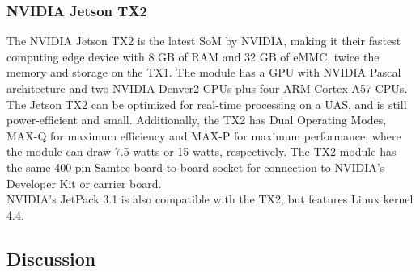 \documentclass[letterpaper,10pt,serif,draftclsnofoot,onecolumn,compsoc,titlepage]{IEEEtran}
\begin{document}
\subsubsection{NVIDIA Jetson TX2}

The NVIDIA Jetson TX2 is the latest SoM by NVIDIA, making it their fastest computing edge
device with 8 GB of RAM and 32 GB of eMMC, twice the memory and storage on the TX1. The 
module has a GPU with NVIDIA Pascal architecture and two NVIDIA Denver2 CPUs plus four 
ARM Cortex-A57 CPUs\cite{TX2Wiki, JetsonFAQ}. The Jetson TX2 can be optimized for 
real-time processing on a UAS, and is 
still power-efficient and small\cite{JetsonGenius}. Additionally, the TX2 has 
Dual Operating Modes, MAX-Q for maximum efficiency and MAX-P for maximum performance, 
where the module can draw 7.5 watts or 15 watts, respectively\cite{TechnoByte}. The TX2 
module has the same 400-pin Samtec board-to-board socket for connection to NVIDIA's 
Developer Kit or carrier board. \\

NVIDIA's JetPack 3.1 is also compatible with the TX2, but features Linux kernel 
4.4\cite{TX2Wiki, JetPackRel}.\\

\subsection{Discussion}
\end{document}
